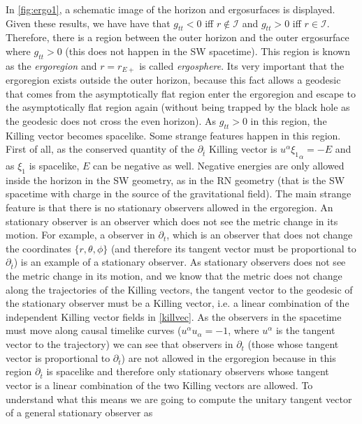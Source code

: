 In \cref{fig:ergo1}, a schematic image of the horizon and ergosurfaces is displayed. Given these results, we have have that $g_{tt}<0$ iff $r \notin \mathcal{I}$ and $g_{tt}>0$ iff $r \in \mathcal{I}$. Therefore, there is a region between the outer horizon and the outer ergosurface where $g_{tt}>0$ (this does not happen in the \gls{SW} spacetime). This region is known as the \textit{ergoregion} and $r=r_{E+}$ is called  \textit{ergosphere}. Its very important that the ergoregion exists outside the outer horizon, because this fact allows a geodesic that comes from the asymptotically flat region enter the ergoregion and escape to the asymptotically flat region again (without being trapped by the black hole as the geodesic does not cross the even horizon). As $g_{tt}>0$ in this region, the Killing vector becomes spacelike. Some strange features happen in this region. First of all, as the conserved quantity of the $\partial_{\bar{t}}$ Killing vector is $ u^\alpha {\xi_1}_\alpha=-E$ and as $\xi_1$ is spacelike, $E$ can be negative as well. Negative energies are only allowed inside the horizon in the \gls{SW} geometry, as in the \gls{RN} geometry (that is the \gls{SW} spacetime with charge in the source of the gravitational field). The main strange feature is that there is no stationary observers allowed in the ergoregion. An stationary observer is an observer which does not see the metric change in its motion. For example, a observer in $\partial_t$, which is an observer that does not change the coordinates $\{r,\theta,\phi\}$ (and therefore its tangent vector must be proportional to $\partial_{\bar{t}}$) is an example of a stationary observer. As stationary observers does not see the metric change in its motion, and we know that the metric does not change along the trajectories of the Killing vectors, the tangent vector to the geodesic of the stationary observer must be a Killing vector, i.e. a linear combination of the independent Killing vector fields in \cref{killvec}. As the observers in the spacetime must move along causal timelike curves ($u^\alpha u_\alpha =-1$, where $u^\alpha$ is the tangent vector to the trajectory) we can see that observers in $\partial_t$ (those whose tangent vector is proportional to $\partial_{\bar{t}}$) are not allowed in the ergoregion because in this region $\partial_{\bar{t}}$ is spacelike and therefore only stationary observers whose tangent vector is a linear combination of the two Killing vectors are allowed. To understand what this means we are going to compute the unitary tangent vector of a general stationary observer as

